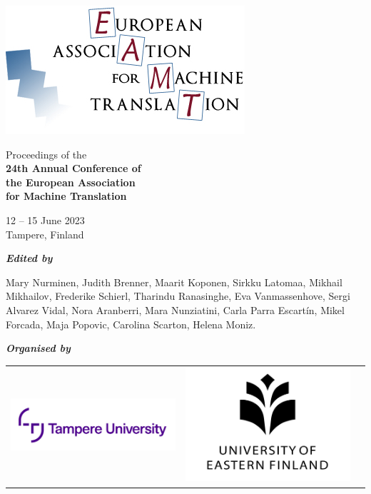 \documentclass[a4paper,11pt,twoside]{book}
\begin{document}
\pagestyle{fancy} 
\lhead{}
\rhead{}
\chead{}
\lfoot{} 
\rfoot{} 
\cfoot{\thepage}

\thispagestyle{empty}
\enlargethispage{1cm}
\begin{center}
\phantom{x}
\vspace{-2cm}

\includegraphics[width=0.8\columnwidth]{logos/eamt-logo.jpg}

\vspace{1cm}

{\huge Proceedings of the}\\[2ex]
\textbf{\huge 24th Annual Conference of \\[0.2ex]
  the European Association\\[1.0ex] for Machine Translation} 
  
\vspace{1.5cm}

{\LARGE 12 -- 15 June 2023\\
\vspace{0.5cm}
Tampere, Finland}
\vspace{3cm}

\textbf{\em Edited by}

\vspace{1em}
Mary Nurminen,
Judith Brenner,
Maarit Koponen,
Sirkku Latomaa,
Mikhail Mikhailov,
Frederike Schierl, 
Tharindu Ranasinghe,
Eva Vanmassenhove,
Sergi Alvarez Vidal,
Nora Aranberri,
Mara Nunziatini,
Carla Parra Escartín,
Mikel Forcada,
Maja Popovic,
Carolina Scarton,
Helena Moniz.

\vfill

\textbf{\em Organised by}

\vspace{1em}
\begin{tabular}{ccc}
\includegraphics[width=0.35\columnwidth]{logos/tau-logo.jpg} & \includegraphics[width=0.30\columnwidth]{logos/uef-logo.jpg}\\
\end{tabular}
\end{center}
\end{document}
